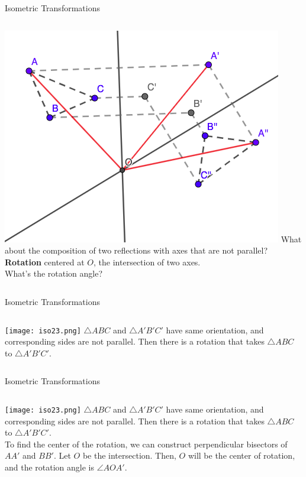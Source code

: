 \documentclass{beamer}
\begin{document}
\begin{frame}{Isometric Transformations}
	\begin{columns}
		\includegraphics[scale=0.4]{iso13.png}
		What about the composition of two reflections with
		axes that are not parallel?\\
		\phantom{Spacing}
		\textbf{Rotation} centered at $O$, the intersection of
		two axes.\\
		\phantom{Spacing}
		What's the rotation angle?
	\end{columns}
\end{frame}
\begin{frame}{Isometric Transformations}
	\begin{columns}
		\column{0.6\textwidth}
		\texttt{[image: iso23.png]}
		\column{0.4\textwidth}
		$\triangle ABC$ and $\triangle A'B'C'$ have same 
		orientation, and corresponding sides are not parallel.
		Then there is a rotation that takes $\triangle ABC$ to
		$\triangle A'B'C'$.
	\end{columns}
\end{frame}
\begin{frame}{Isometric Transformations}
	\begin{columns}
		\texttt{[image: iso23.png]}
		$\triangle ABC$ and $\triangle A'B'C'$ have same 
		orientation, and corresponding sides are not parallel.
		Then there is a rotation that takes $\triangle ABC$ to
		$\triangle A'B'C'$.\\
		\phantom{Spacing}
		To find the center of the rotation, we can construct
		perpendicular bisectors of $A A'$ and $BB'$. Let $O$ 
		be the intersection. Then, $O$ will be the 
		center of rotation, and the rotation angle is $\angle 
		AO A'$.
	\end{columns}
\end{frame}
\end{document}
